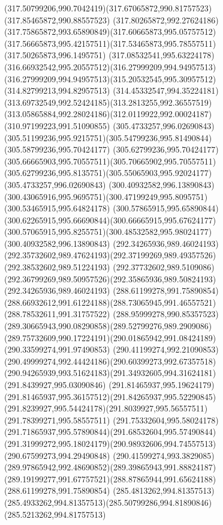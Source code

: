 {{		\curveto(317.50799206,990.7042419)(317.67065872,990.81757523)(317.85465872,990.88557523)
		\curveto(317.80265872,992.27624186)(317.75865872,993.65890849)(317.60665873,995.05757512)
		\curveto(317.56665873,995.42157511)(317.53465873,995.78557511)(317.50265873,996.1495751)
		\curveto(317.08532541,995.63224178)(316.66932542,995.20557512)(316.27999209,994.94957513)
		\curveto(316.27999209,994.94957513)(315.20532545,995.30957512)(314.82799213,994.82957513)
		\curveto(314.45332547,994.35224181)(313.69732549,992.52424185)(313.2813255,992.36557519)
		\curveto(313.05865884,992.28024186)(312.0119922,992.00024187)(310.97199223,991.51090855)
		\moveto(305.4733257,996.02690843)
		\curveto(305.51199236,995.9215751)(305.54799236,995.81490844)(305.58799236,995.70424177)
		\curveto(305.62799236,995.70424177)(305.66665903,995.70557511)(305.70665902,995.70557511)
		\curveto(305.62799236,995.8135751)(305.55065903,995.92024177)(305.4733257,996.02690843)
		\moveto(300.40932582,996.13890843)
		\curveto(300.43065916,995.9695751)(300.47199249,995.8095751)(300.53465915,995.64824178)
		\curveto(300.57865915,995.65890844)(300.62265915,995.66690844)(300.66665915,995.67624177)
		\curveto(300.57065915,995.8255751)(300.48532582,995.98024177)(300.40932582,996.13890843)
		\moveto(292.34265936,989.46024193)
		\curveto(292.35732602,989.47624193)(292.37199269,989.49357526)(292.38532602,989.51224193)
		\curveto(292.37732602,989.5109086)(292.36799269,989.50957526)(292.35865936,989.50824193)
		\lineto(292.34265936,989.46024193)
		\moveto(288.61199278,991.75890854)
		\curveto(288.66932612,991.61224188)(288.73065945,991.46557521)(288.78532611,991.31757522)
		\curveto(288.95999278,990.85357523)(289.30665943,990.08290858)(289.52799276,989.2909086)
		\curveto(289.75732609,990.17224191)(290.01865942,991.08424189)(290.33599274,991.97490853)
		\curveto(290.41199274,992.21090853)(290.49999274,992.44424186)(290.60399273,992.67357518)
		\curveto(290.94265939,993.51624183)(291.34932605,994.31624181)(291.8439927,995.03090846)
		\curveto(291.81465937,995.19624179)(291.81465937,995.36157512)(291.84265937,995.52290845)
		\curveto(291.8239927,995.54424178)(291.8039927,995.56557511)(291.78399271,995.58557511)
		\curveto(291.75332604,995.58024178)(291.71865937,995.57890844)(291.68532604,995.57490844)
		\curveto(291.31999272,995.18024179)(290.98932606,994.74557513)(290.67599273,994.29490848)
		\curveto(290.41599274,993.3829085)(289.97865942,992.48690852)(289.39865943,991.88824187)
		\curveto(289.19199277,991.67757521)(288.87865944,991.65624188)(288.61199278,991.75890854)
		\moveto(285.4813262,994.81357513)
		\curveto(285.4933262,994.81357513)(285.50799286,994.81890846)(285.5213262,994.81757513)
}}

